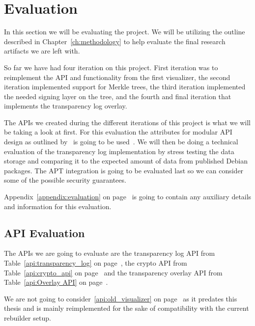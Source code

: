 \documentclass[../Main/thesis.tex]{subfiles}
\begin{document}
\chapter{Evaluation}%
\label{ch:evaluation}
In this section we will be evaluating the project. We will be utilizing the
outline described in Chapter~\ref{ch:methodology} to help evaluate the final
research artifacts we are left with.

So far we have had four iteration on this project. First iteration was to
reimplement the API and functionality from the first visualizer, the second
iteration implemented support for Merkle trees, the third iteration implemented
the needed signing layer on the tree, and the fourth and final iteration that
implements the transparency log overlay.

The APIs we created during the different iterations of this project is what we
will be taking a look at first. For this evaluation the attributes for modular
API design as outlined by~\citeauthor{Iyer:2012:EAC:2342209.2342213} is going to
be used~\cite{Iyer:2012:EAC:2342209.2342213}. We will then be doing a technical
evaluation of the transparency log implementation by stress testing the data
storage and comparing it to the expected amount of data from published Debian
packages. The APT integration is going to be evaluated last so we can consider
some of the possible security guarantees.

Appendix~\ref{appendix:evaluation} on page~\pageref{appendix:evaluation} is
going to contain any auxiliary details  and information for this evaluation.


\section{API Evaluation}%
\label{sec:api_evaluation}
The APIs we are going to evaluate are the transparency log API from
Table~\ref{api:transparency_log} on page~\pageref{api:transparency_log}, the
crypto API from Table~\ref{api:crypto_api} on page~\pageref{api:crypto_api} and
the transparency overlay API from Table~\ref{api:Overlay API} on
page~\pageref{api:Overlay API}.

We are not going to consider~\ref{api:old_visualizer} on
page~\pageref{api:old_visualizer} as it predates this thesis and is mainly
reimplemented for the sake of compatibility with the current rebuilder setup.
\end{document}
